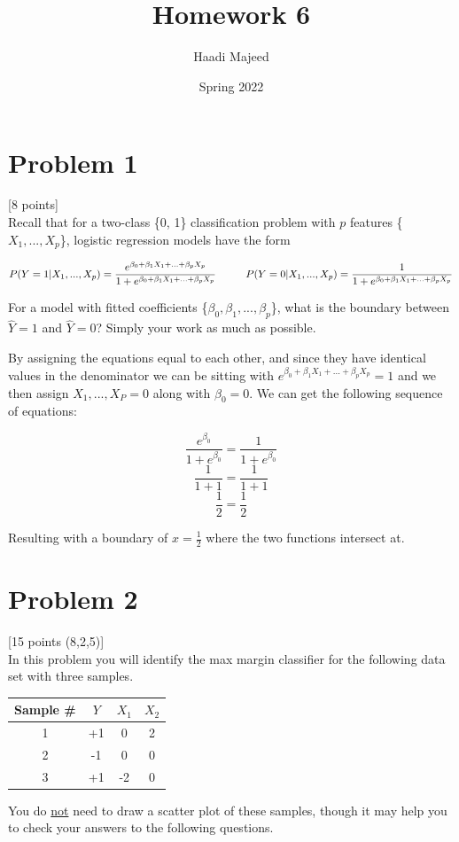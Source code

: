 \documentclass[12pt]{article}
\title{ \course \\\large Homework 6 }
\author{ Haadi Majeed }
\date{Spring 2022}
\newcommand\tab[1][1cm]{\hspace*{#1}}
\begin{document}
\maketitle
\pagebreak

\pagebreak
\section{Problem 1}
 [8 points]\\
Recall that for a two-class \{0, 1\} classification problem with $p$ features \{$X_1, . . . , X_p$\}, logistic regression models have the form
\begin{center}
    \[
        P(Y=1 | X_1, . . . , X_p) = \frac{e^{\beta_0+\beta_1X_1+...+\beta_pX_p}}{1 + e^{\beta_0+\beta_1X_1+...+\beta_pX_p}} \tab P(Y=0 | X_1, . . . , X_p) = \frac{1}{1 + e^{\beta_0+\beta_1X_1+...+\beta_pX_p}}
    \]
\end{center}
For a model with fitted coefficients \{$\beta_0, \beta_1, . . . , \beta_p$\}, what is the boundary between $\hat{Y} = 1$ and $\hat{Y} = 0$? Simply your work as much as possible.


By assigning the equations equal to each other, and since they have identical values in the denominator we can be sitting with $e^{\beta_0+\beta_1X_1+...+\beta_pX_p} = 1$ and we then assign ${X_1, ..., X_P} = 0$ along with $\beta_0 = 0$. We can get the following sequence of equations:
\begin{center}
    \[
        \frac{e^{\beta_0}}{1 + e^{\beta_0}} = \frac{1}{1 + e^{\beta_0}}
    \]
    \[
        \frac{1}{1+1} = \frac{1}{1+1}
    \]
    \[
        \frac{1}{2} = \frac{1}{2}
    \]
\end{center}
Resulting with a boundary of $x = \frac{1}{2}$ where the two functions intersect at.
\pagebreak
\section{Problem 2}
 [15 points (8,2,5)]\\
In this problem you will identify the max margin classifier for the following data set with three samples.
\begin{center}
    \begin{tabular}{ |c|c|c|c| }
        \hline
        Sample \# & $Y$ & $X_1$ & $X_2$ \\
        \hline
        1         & +1  & 0     & 2     \\
        \hline
        2         & -1  & 0     & 0     \\
        \hline
        3         & +1  & -2    & 0     \\
        \hline
    \end{tabular}
\end{center}
You do \underline{not} need to draw a scatter plot of these samples, though it may help you to check your answers to the following questions.
\end{document}
